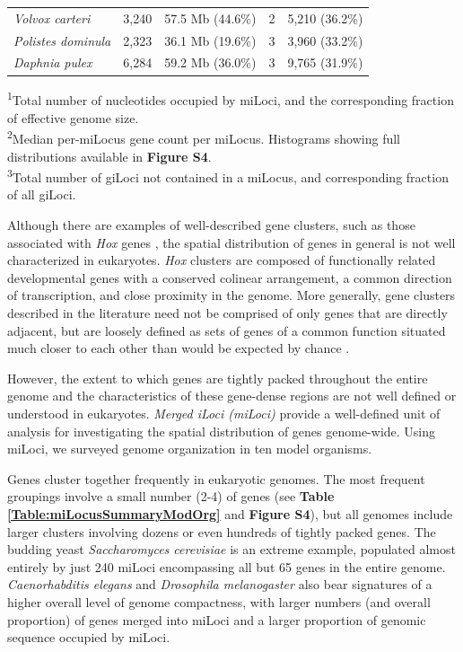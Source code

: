 \begin{table}
\begin{tabularx}{\textwidth}{lrrrr}
\textit{Volvox carteri}             &                3,240 &             57.5 Mb (44.6\%) &                             2 &                5,210 (36.2\%)  \\
\textit{Polistes dominula}          &                2,323 &             36.1 Mb (19.6\%) &                             3 &                3,960 (33.2\%)  \\
\textit{Daphnia pulex}              &                6,284 &             59.2 Mb (36.0\%) &                             3 &                9,765 (31.9\%)  \\ \hline
\end{tabularx}
\raggedright
{\scriptsize
\textsuperscript{1}Total number of nucleotides occupied by miLoci, and the corresponding fraction of effective genome size. \\
\textsuperscript{2}Median per-miLocus gene count per miLocus. Histograms showing full distributions available in \textbf{Figure S4}.  \\
\textsuperscript{3}Total number of giLoci not contained in a miLocus, and corresponding fraction of all giLoci.
}
\end{table}

Although there are examples of well-described gene clusters, such as those associated with \textit{Hox} genes \cite{HoxClusters}, the spatial distribution of genes in general is not well characterized in eukaryotes.
\textit{Hox} clusters are composed of functionally related developmental genes with a conserved colinear arrangement, a common direction of transcription, and close proximity in the genome.
More generally, gene clusters described in the literature need not be comprised of only genes that are directly adjacent, but are loosely defined as sets of genes of a common function situated much closer to each other than would be expected by chance \cite{ClusterFunc}.

However, the extent to which genes are tightly packed throughout the entire genome and the characteristics of these gene-dense regions are not well defined or understood in eukaryotes.
\textit{Merged iLoci (miLoci)} provide a well-defined unit of analysis for investigating the spatial distribution of genes genome-wide.
Using miLoci, we surveyed genome organization in ten model organisms.

Genes cluster together frequently in eukaryotic genomes.
The most frequent groupings involve a small number (2-4) of genes (see \textbf{Table \ref{Table:miLocusSummaryModOrg}} and \textbf{Figure S4}), but all genomes include larger clusters involving dozens or even hundreds of tightly packed genes.
The budding yeast \textit{Saccharomyces cerevisiae} is an extreme example, populated almost entirely by just 240 miLoci encompassing all but 65 genes in the entire genome.
\textit{Caenorhabditis elegans} and \textit{Drosophila melanogaster} also bear signatures of a higher overall level of genome compactness, with larger numbers (and overall proportion) of genes merged into miLoci and a larger proportion of genomic sequence occupied by miLoci.

